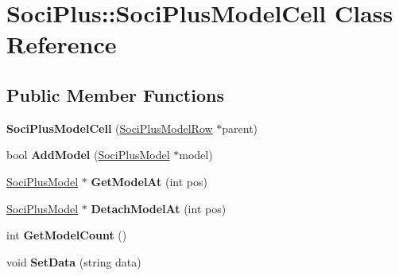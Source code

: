 \hypertarget{class_soci_plus_1_1_soci_plus_model_cell}{\section{Soci\+Plus\+:\+:Soci\+Plus\+Model\+Cell Class Reference}
\label{class_soci_plus_1_1_soci_plus_model_cell}
}
\subsection*{Public Member Functions}
\begin{DoxyCompactItemize}
\item 
\hypertarget{class_soci_plus_1_1_soci_plus_model_cell_ab9e251e4d2f63e832c9c5bee400c0c0c}{{\bfseries Soci\+Plus\+Model\+Cell} (\hyperlink{class_soci_plus_1_1_soci_plus_model_row}{Soci\+Plus\+Model\+Row} $\ast$parent)}\label{class_soci_plus_1_1_soci_plus_model_cell_ab9e251e4d2f63e832c9c5bee400c0c0c}

\item 
\hypertarget{class_soci_plus_1_1_soci_plus_model_cell_ae25adc0e4fad7280d119ee6889adeea8}{bool {\bfseries Add\+Model} (\hyperlink{class_soci_plus_1_1_soci_plus_model}{Soci\+Plus\+Model} $\ast$model)}\label{class_soci_plus_1_1_soci_plus_model_cell_ae25adc0e4fad7280d119ee6889adeea8}

\item 
\hypertarget{class_soci_plus_1_1_soci_plus_model_cell_a4633ae0e2129dad5e74569591e190063}{\hyperlink{class_soci_plus_1_1_soci_plus_model}{Soci\+Plus\+Model} $\ast$ {\bfseries Get\+Model\+At} (int pos)}\label{class_soci_plus_1_1_soci_plus_model_cell_a4633ae0e2129dad5e74569591e190063}

\item 
\hypertarget{class_soci_plus_1_1_soci_plus_model_cell_a830aa6986f415dec745430f559958a69}{\hyperlink{class_soci_plus_1_1_soci_plus_model}{Soci\+Plus\+Model} $\ast$ {\bfseries Detach\+Model\+At} (int pos)}\label{class_soci_plus_1_1_soci_plus_model_cell_a830aa6986f415dec745430f559958a69}

\item 
\hypertarget{class_soci_plus_1_1_soci_plus_model_cell_a24737b85906a86a3d0f089123a734eb7}{int {\bfseries Get\+Model\+Count} ()}\label{class_soci_plus_1_1_soci_plus_model_cell_a24737b85906a86a3d0f089123a734eb7}

\item 
\hypertarget{class_soci_plus_1_1_soci_plus_model_cell_abd3344bdae57c006d12d5374e0ca36b7}{void {\bfseries Set\+Data} (string data)}\label{class_soci_plus_1_1_soci_plus_model_cell_abd3344bdae57c006d12d5374e0ca36b7}


\end{DoxyCompactItemize}
